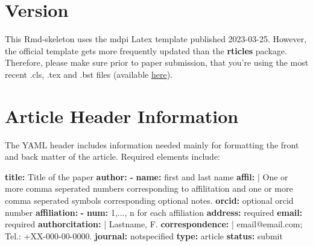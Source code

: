 \documentclass[notspecified,article,submit,moreauthors,pdftex]{Definitions/mdpi}
\newenvironment{Shaded}{\begin{snugshade}}{\end{snugshade}}
\newcommand{\AttributeTok}[1]{\textcolor[rgb]{0.13,0.29,0.53}{#1}}
\newcommand{\CharTok}[1]{\textcolor[rgb]{0.31,0.60,0.02}{#1}}
\newcommand{\FunctionTok}[1]{\textcolor[rgb]{0.13,0.29,0.53}{\textbf{#1}}}
\newcommand{\KeywordTok}[1]{\textcolor[rgb]{0.13,0.29,0.53}{\textbf{#1}}}
\newcommand{\NormalTok}[1]{#1}
\begin{document}

\newcommand{\pandocbounded}[1]{#1}

\section{Version}\label{version}

This Rmd-skeleton uses the mdpi Latex template published 2023-03-25.
However, the official template gets more frequently updated than the
\textbf{rticles} package. Therefore, please make sure prior to paper
submission, that you're using the most recent .cls, .tex and .bst files
(available \href{http://www.mdpi.com/authors/latex}{here}).

\section{Article Header Information}\label{article-header-information}

The YAML header includes information needed mainly for formatting the
front and back matter of the article. Required elements include:

\begin{Shaded}
\begin{Highlighting}[]
\FunctionTok{title}\KeywordTok{:}\AttributeTok{ Title of the paper}
\FunctionTok{author}\KeywordTok{:}
\AttributeTok{  }\KeywordTok{{-}}\AttributeTok{ }\FunctionTok{name}\KeywordTok{:}\AttributeTok{ first and last name}
\FunctionTok{    affil}\KeywordTok{: }\CharTok{|}
\NormalTok{      One or more comma seperated numbers corresponding to affilitation}
\NormalTok{      and one or more  comma seperated symbols corresponding }
\NormalTok{      optional notes.}
\AttributeTok{    }\FunctionTok{orcid}\KeywordTok{:}\AttributeTok{ optional orcid number}
\FunctionTok{affiliation}\KeywordTok{:}\AttributeTok{  }
\AttributeTok{  }\KeywordTok{{-}}\AttributeTok{ }\FunctionTok{num}\KeywordTok{:}\AttributeTok{ 1,..., n for each affiliation}
\AttributeTok{    }\FunctionTok{address}\KeywordTok{:}\AttributeTok{ required}
\AttributeTok{    }\FunctionTok{email}\KeywordTok{:}\AttributeTok{ required}
\FunctionTok{authorcitation}\KeywordTok{: }\CharTok{|}
\NormalTok{  Lastname, F.}
\FunctionTok{correspondence}\KeywordTok{: }\CharTok{|}
\NormalTok{  email@email.com; Tel.: +XX{-}000{-}00{-}0000.}
\FunctionTok{journal}\KeywordTok{:}\AttributeTok{ notspecified}
\FunctionTok{type}\KeywordTok{:}\AttributeTok{ article}
\FunctionTok{status}\KeywordTok{:}\AttributeTok{ submit}
\end{Highlighting}
\end{Shaded}
\end{document}
